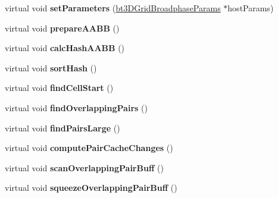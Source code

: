 \begin{DoxyCompactItemize}
virtual void {\bfseries set\+Parameters} (\hyperlink{structbt3DGridBroadphaseParams}{bt3\+D\+Grid\+Broadphase\+Params} $\ast$host\+Params)
\item 
\mbox{\label{classbtGpu3DGridBroadphase_a7c616ef21b6e0845a406e947bab665ff}} 
virtual void {\bfseries prepare\+A\+A\+BB} ()
\item 
\mbox{\label{classbtGpu3DGridBroadphase_a3ee79a36e9f18fbbee5b273ae9aeb415}} 
virtual void {\bfseries calc\+Hash\+A\+A\+BB} ()
\item 
\mbox{\label{classbtGpu3DGridBroadphase_a1f0b596c8235c470bbdd2e01c61fea09}} 
virtual void {\bfseries sort\+Hash} ()
\item 
\mbox{\label{classbtGpu3DGridBroadphase_ac0ee2fdb46aecc040660c9580cf05c04}} 
virtual void {\bfseries find\+Cell\+Start} ()
\item 
\mbox{\label{classbtGpu3DGridBroadphase_ae7f5fcee7e2c72cb2ef42226e06a9adb}} 
virtual void {\bfseries find\+Overlapping\+Pairs} ()
\item 
\mbox{\label{classbtGpu3DGridBroadphase_a9a21025a31bab98e0a46ad76c667a1fc}} 
virtual void {\bfseries find\+Pairs\+Large} ()
\item 
\mbox{\label{classbtGpu3DGridBroadphase_a27157dfc55d379c018dda5621f5c67a2}} 
virtual void {\bfseries compute\+Pair\+Cache\+Changes} ()
\item 
\mbox{\label{classbtGpu3DGridBroadphase_aec0893a566324285d7bc4e1e92b0cbcc}} 
virtual void {\bfseries scan\+Overlapping\+Pair\+Buff} ()
\item 
\mbox{\label{classbtGpu3DGridBroadphase_a9205774ff03df5908f783ea8e78c5954}} 
virtual void {\bfseries squeeze\+Overlapping\+Pair\+Buff} ()
\end{DoxyCompactItemize}
